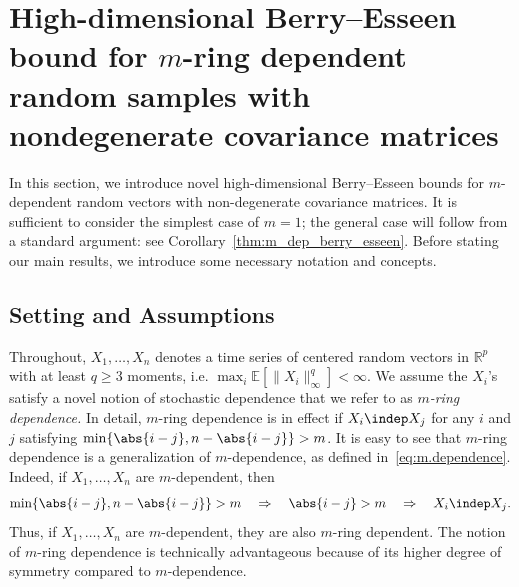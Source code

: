 \documentclass[aos]{imsart}
\begin{document}

\section{High-dimensional Berry--Esseen bound for \texorpdfstring{$m$}{m}-ring dependent random samples with nondegenerate covariance matrices} \label{sec:theoretical_result}

In this section, we introduce novel high-dimensional Berry--Esseen bounds for $m$-dependent random vectors with non-degenerate covariance matrices. It is sufficient to consider the simplest case of $m=1$; the general case will follow from a standard argument: see Corollary~\ref{thm:m_dep_berry_esseen}.
Before stating our main results, we introduce some necessary notation and concepts. 

 \subsection{Setting and Assumptions}\label{sec:setting_assumption}

Throughout, $X_1,\ldots,X_n$ denotes a time series of centered random vectors in $\mathbb{R}^p$ with at least $q \geq 3$ moments, i.e. $\max_i \mathbb{E}[\| X_i \|^q_\infty] < \infty$. We assume the $X_i$'s satisfy a novel notion of stochastic dependence that we refer to as {\it $m$-ring dependence.} In detail, $m$-ring dependence is in effect if $X_i \indep X_j$ for any $i$ and $j$ satisfying $\min\{\abs{i-j}, n-\abs{i-j}\} > m$. It is easy to see that $m$-ring dependence is a generalization of $m$-dependence, as defined in~\eqref{eq:m.dependence}. Indeed, if $X_1, \ldots, X_n$ are $m$-dependent, then
\begin{equation*}
    \min\{\abs{i-j}, n-\abs{i-j}\} > m\quad
    \Rightarrow\quad \abs{i-j} > m\quad
    \Rightarrow\quad X_i \indep X_j.
\end{equation*}
Thus, if $X_1, \dots, X_n$ are $m$-dependent, they are also $m$-ring dependent. The notion of $m$-ring dependence is technically advantageous because of its higher degree of symmetry compared to $m$-dependence.
\end{document}
